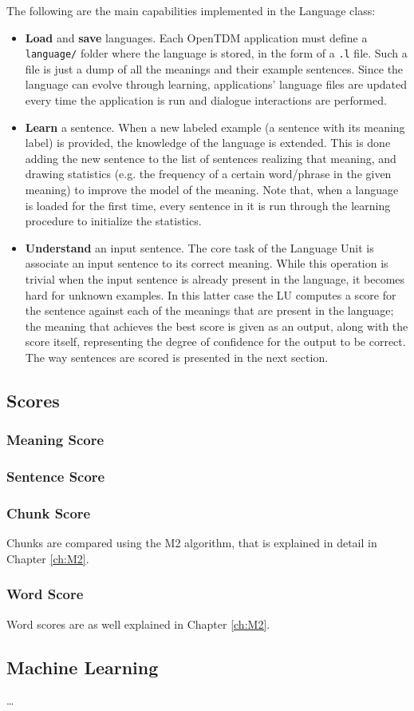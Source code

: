 The following are the main capabilities implemented in the Language class:
\begin{itemize}
\item \textbf{Load} and \textbf{save} languages. Each OpenTDM application must define a \texttt{language/} folder where the language is stored, in the form of a \texttt{.l} file. Such a file is just a dump of all the meanings and their example sentences. Since the language  can evolve through learning, applications' language files are updated every time the application is run and dialogue interactions are performed.
\item \textbf{Learn} a sentence. When a new labeled example (a sentence with its meaning label) is provided, the knowledge of the language is extended. This is done adding the new sentence to the list of sentences realizing that meaning, and drawing statistics (e.g. the frequency of a certain word/phrase in the given meaning) to improve the model of the meaning. Note that, when a language is loaded for the first time, every sentence in it is run through the learning procedure to initialize the statistics.
\item \textbf{Understand} an input sentence. The core task of the Language Unit is associate an input sentence to its correct meaning. While this operation is trivial when the input sentence is already present in the language, it becomes hard for unknown examples. In this latter case the LU computes a score for the sentence against each of the meanings that are present in the language; the meaning that achieves the best score is given as an output, along with the score itself, representing the degree of confidence for the output to be correct. The way sentences are scored is presented in the next section.
\end{itemize}

\subsection{Scores}

\subsubsection{Meaning Score}

\subsubsection{Sentence Score}

\subsubsection{Chunk Score}
Chunks are compared using the M2 algorithm, that is explained in detail in Chapter \ref{ch:M2}.

\subsubsection{Word Score}
Word scores are as well explained in Chapter \ref{ch:M2}.

\subsection{Machine Learning}


\ldots
